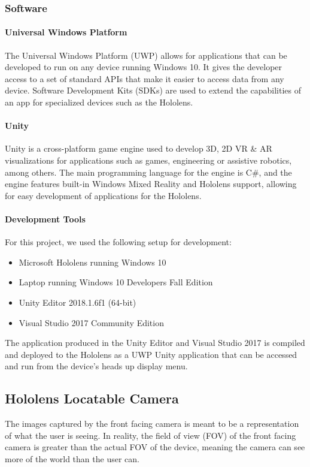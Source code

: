 \subsubsection{Software}
\paragraph{Universal Windows Platform} The Universal Windows Platform (UWP) allows for applications that can be developed to run on any device running Windows 10. It gives the developer access to a set of standard APIs that make it easier to access data from any device. Software Development Kits (SDKs) are used to extend the capabilities of an app for specialized devices such as the Hololens.

\paragraph{Unity} Unity is a cross-platform game engine used to develop 3D, 2D VR \& AR visualizations for applications such as games, engineering or assistive robotics, among others. The main programming language for the engine is C\#, and the engine features built-in Windows Mixed Reality and Hololens support, allowing for easy development of applications for the Hololens. 

\paragraph{Development Tools} For this project, we used the following setup for development:

\begin{itemize}
	\item Microsoft Hololens running Windows 10
	\item Laptop running Windows 10 Developers Fall Edition
	\item Unity Editor 2018.1.6f1 (64-bit)
	\item Visual Studio 2017 Community Edition
\end{itemize}

The application produced in the Unity Editor and Visual Studio 2017 is compiled and deployed to the Hololens as a UWP Unity application that can be accessed and run from the device's heads up display menu.

\subsection{Hololens Locatable Camera}
The images captured by the front facing camera is meant to be a representation of what the user is seeing. In reality, the field of view (FOV) of the front facing camera is greater than the actual FOV of the device, meaning the camera can see more of the world than the user can. 

